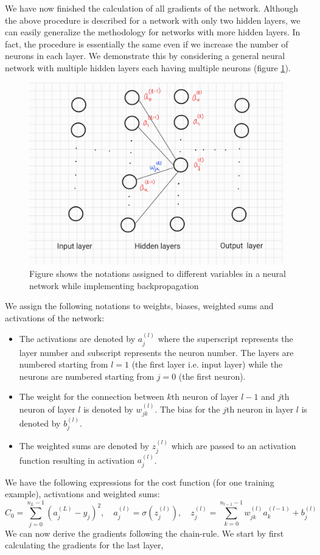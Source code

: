 We have now finished the calculation of all gradients of the network. Although the above procedure is described for a network with only two hidden layers, 
we can easily generalize the methodology for networks with more hidden layers. In fact, the procedure is essentially the same even if we increase the number of neurons
in each layer. We demonstrate this by considering a general neural network with multiple hidden layers each having multiple neurons (figure \ref{fig:back_p}). 
\begin{figure}
    \centering
        \includegraphics[width=.5\textwidth, angle = -90]{Figures/back_prop.jpg}
        \caption{Figure shows the notations assigned to different variables in a neural network while implementing backpropagation}
        \label{fig:back_p}
    \end{figure} 
We assign the following notations to weights, biases, weighted sums and activations of the network:
\begin{itemize}
    \item The activations are denoted by $a_j^{(l)}$ where the superscript represents the layer number and subscript represents the neuron number. The 
    layers are numbered starting from $l=1$ (the first layer i.e. input layer) while the neurons are numbered starting from $j=0$ (the first neuron).
    \item The weight for the connection between $k$th neuron of layer $l-1$ and $j$th neuron of layer $l$ is denoted by $w_{jk}^{(l)}$. The bias for the $j$th neuron in
    layer $l$ is denoted by $b_j^{(l)}$.
    \item The weighted sums are denoted by $z_j^{(l)}$ which are passed to an activation function resulting in activation $a_j^{(l)}$.
\end{itemize}
We have the following expressions for the cost function (for one training example), activations and weighted sums:
$$C_0 = \sum_{j=0}^{n_L -1} (a_j^{(L)} - y_j)^2, \quad a_j^{(l)} = \sigma(z_j^{(l)}), \quad z_j^{(l)} = \sum_{k=0}^{n_{l-1} -1} w_{jk}^{(l)}a_k^{(l-1)} + b_j^{(l)}$$
We can now derive the gradients following the chain-rule. We start by first calculating the gradients for the last layer,
